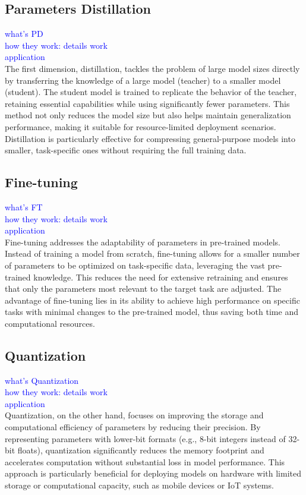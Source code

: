 \subsection{Parameters Distillation}
\textcolor{blue}{what's PD}\\
\textcolor{blue}{how they work: details work}\\
\textcolor{blue}{application}\\
The first dimension, distillation, tackles the problem of large model sizes directly by transferring the knowledge of a large model (teacher) to a smaller model (student). The student model is trained to replicate the behavior of the teacher, retaining essential capabilities while using significantly fewer parameters. This method not only reduces the model size but also helps maintain generalization performance, making it suitable for resource-limited deployment scenarios. Distillation is particularly effective for compressing general-purpose models into smaller, task-specific ones without requiring the full training data.

\subsection{Fine-tuning}
\textcolor{blue}{what's FT}\\
\textcolor{blue}{how they work: details work}\\
\textcolor{blue}{application}\\
Fine-tuning addresses the adaptability of parameters in pre-trained models. Instead of training a model from scratch, fine-tuning allows for a smaller number of parameters to be optimized on task-specific data, leveraging the vast pre-trained knowledge. This reduces the need for extensive retraining and ensures that only the parameters most relevant to the target task are adjusted. The advantage of fine-tuning lies in its ability to achieve high performance on specific tasks with minimal changes to the pre-trained model, thus saving both time and computational resources.

\subsection{Quantization}
\textcolor{blue}{what's Quantization}\\
\textcolor{blue}{how they work: details work}\\
\textcolor{blue}{application}\\
Quantization, on the other hand, focuses on improving the storage and computational efficiency of parameters by reducing their precision. By representing parameters with lower-bit formats (e.g., 8-bit integers instead of 32-bit floats), quantization significantly reduces the memory footprint and accelerates computation without substantial loss in model performance. This approach is particularly beneficial for deploying models on hardware with limited storage or computational capacity, such as mobile devices or IoT systems.

